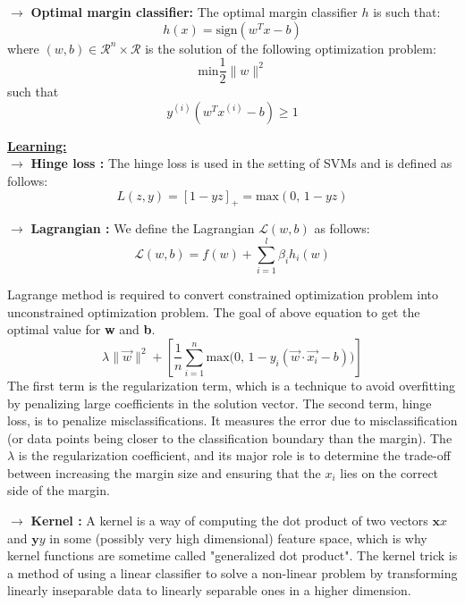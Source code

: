 \documentclass[letterpaper, 10.5pt,landscape]{article}
\begin{document}
\begin{multicols*}{3}

\vspace{3pt}
$\rightarrow$ \textbf{Optimal margin classifier: } The optimal margin classifier $h$ is such that: 
\vspace{-5pt}
\[\boxed{h(x) = \text{sign}(w^{T}x - b)} \]
where $(w, b) \in \mathcal{R}^{n} \times \mathcal{R}$ is the  solution of the following optimization problem:
\vspace{-5pt}
\[ \boxed{\text{min}\frac{1}{2} \lVert {w} \rVert^{2} }\] such that \hspace{5pt} \[\boxed{y^{(i)} (w^{T}x^{(i)} - b) \geq 1}\]

\vspace{3pt}


\textbf{\underline{Learning:}} \\
$\rightarrow$ \textbf{Hinge loss : } The hinge loss is used in the setting of SVMs and is defined as follows:
\vspace{-3pt}
\[\boxed{L(z,y) = \left[1 - yz  \right]_{+} = \text{max}(0, \, 1-yz)} \]

\vspace{3pt}
$\rightarrow$ \textbf{Lagrangian : } We define the Lagrangian $\mathcal{L}(w, b)$ as follows:
\vspace{-5pt}
\[\boxed{\mathcal{L}(w, b) = f(w) + \sum^{l}_{i=1} \beta_{i} h_{i} (w) }\]


Lagrange method is required to convert constrained optimization problem into unconstrained optimization problem. The goal of above equation to get the optimal value for \textbf{w} and \textbf{b}.
\vspace{-5pt}
\[\boxed{ \lambda \lVert \vec{w} \rVert^{2} + \left[ \frac{1}{n} \sum^{n}_{i=1} \text{max} \big(0, \, 1 - y_{i}(\vec{w} \cdot \vec{x_{i}} - b) \big)\right] }  \] 
The first term is the regularization term, which is a technique to avoid overfitting by penalizing large coefficients in the solution vector. The second term, hinge loss, is to penalize misclassifications. It measures the error due to misclassification (or data points being closer to the classification boundary than the margin).  The $\lambda$ is the regularization coefficient, and its major role is to determine the trade-off between increasing the margin size and ensuring that the $x_{i}$ lies on the correct side of the margin.




\vspace{3pt}
$\rightarrow$ \textbf{Kernel : } A kernel is a way of computing the dot product of two vectors $\textbf{x}x$ and $\textbf{y}y$ in some (possibly very high dimensional) feature space, which is why kernel functions are sometime called "generalized dot product". The kernel trick is a method of using a linear classifier to solve a non-linear problem by transforming linearly inseparable data to linearly separable ones in a higher dimension.\\


\end{multicols*}
\end{document}
